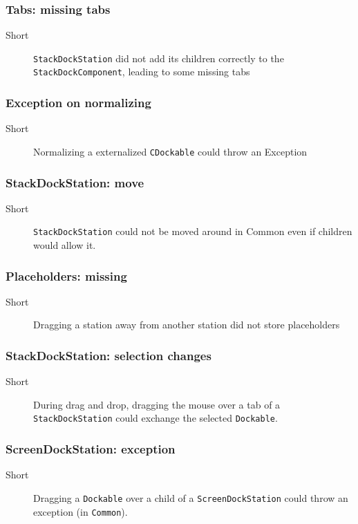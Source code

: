 \documentclass[a4paper,10pt]{article}
\newcommand{\src}[1]{\lstinline[basicstyle=\normalsize\ttfamily,keywordstyle=\normalsize\ttfamily,identifierstyle=\normalsize\ttfamily]|#1|}
\newcommand{\short}{\item[Short]}
\begin{document}
\subsubsection{Tabs: missing tabs}
\begin{description}
 \short \src{StackDockStation} did not add its children correctly to the \src{StackDockComponent}, leading to some missing tabs
\end{description}

\subsubsection{Exception on normalizing}
\begin{description}
 \short Normalizing a externalized \src{CDockable} could throw an Exception
\end{description}


\subsubsection{StackDockStation: move}
\begin{description}
 \short \src{StackDockStation} could not be moved around in Common even if children would allow it.
\end{description}

\subsubsection{Placeholders: missing}
\begin{description}
 \short Dragging a station away from another station did not store placeholders
\end{description}

\subsubsection{StackDockStation: selection changes}
\begin{description}
 \short During drag and drop, dragging the mouse over a tab of a \src{StackDockStation} could exchange the selected \src{Dockable}.
\end{description}

\subsubsection{ScreenDockStation: exception}
\begin{description}
 \short Dragging a \src{Dockable} over a child of a \src{ScreenDockStation} could throw an exception (in \src{Common}).
\end{description}
\end{document}
